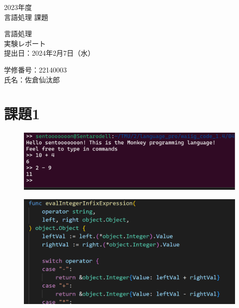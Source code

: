 \documentclass[fleqn, a4paper. 12pt]{ltjsarticle}
\begin{document}
\begin{titlepage}
      \begin{center}
      {
      \Huge 2023年度\\言語処理 課題}
      
      \vspace{4cm}
             {\Huge 言語処理\\
               実験レポート\\}
             \vspace{4cm}
                    {\large 提出日：2024年2月7日（水）\\}
                    
                    {\large 学修番号：22140003\\氏名：佐倉仙汰郎}
    \end{center}  
  \end{titlepage}

  \section{課題1}
  \begin{figure}[h]
    \centering
    \includegraphics[width=0.5\linewidth]{images/1_a.png}
    \label{fig:example}
\end{figure}
\begin{figure}[h]
    \centering
    \includegraphics[width=0.5\linewidth]{images/1_b.png}
    \label{fig:example}
\end{figure}
\end{document}
